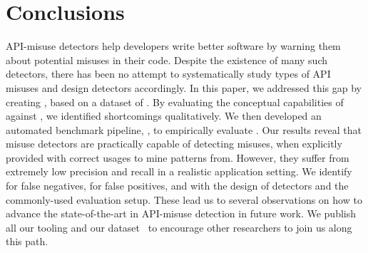 
\section{Conclusions} %
\label{sec:conclusions}

API-misuse detectors help developers write better software by warning them about potential misuses in their code.
Despite the existence of many such detectors, there has been no attempt to systematically study types of API misuses and design detectors accordingly.
%
In this paper, we addressed this gap by creating \MUC, based on a dataset of .
By evaluating the conceptual capabilities of  against \MUC, we identified shortcomings qualitatively.
We then developed an automated benchmark pipeline, \MUPipe, to empirically evaluate .
Our results reveal that misuse detectors are practically capable of detecting misuses, when explicitly provided with correct usages to mine patterns from.
However, they suffer from extremely low precision and recall in a realistic application setting.
%
We identify  for false negatives,  for false positives, and  with the design of detectors and the commonly-used evaluation setup.
These lead us to several observations on how to advance the state-of-the-art in API-misuse detection in future work.
We publish all our tooling and our dataset~\cite{mubench} to encourage other researchers to join us along this path.

